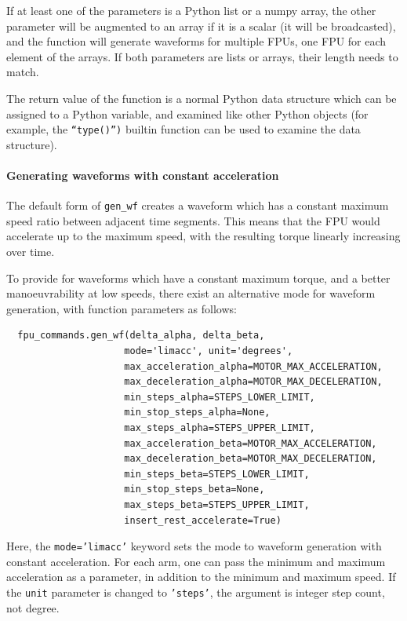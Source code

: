 \documentclass[11pt,a4paper]{report}
\begin{document}
%
If at least one of the parameters is a Python list or a numpy array,
the other parameter will be augmented to an array if it is a scalar
(it will be broadcasted), and the function will generate waveforms for
multiple FPUs, one FPU for each element of the arrays. If both
parameters are lists or arrays, their length needs to match.

The return value of the function is a normal Python data structure
which can be assigned to a Python variable, and examined like other
Python objects (for example, the \texttt{``type()'')} builtin function
can be used to examine the data structure).

\paragraph{Generating waveforms with constant acceleration}
\label{sec:genwf:constant-acceleration}
The default form of \texttt{gen\_wf} creates a waveform which has
a constant maximum speed ratio between adjacent time segments.
This means that the FPU would accelerate up to the maximum speed,
with the resulting torque linearly increasing over time.

To provide for waveforms which have a constant maximum torque, and a
better manoeuvrability at low speeds, there exist an alternative mode
for waveform generation, with function parameters as follows:

\begin{verbatim}
  fpu_commands.gen_wf(delta_alpha, delta_beta,
                     mode='limacc', unit='degrees',
                     max_acceleration_alpha=MOTOR_MAX_ACCELERATION,
                     max_deceleration_alpha=MOTOR_MAX_DECELERATION,
                     min_steps_alpha=STEPS_LOWER_LIMIT,
                     min_stop_steps_alpha=None,
                     max_steps_alpha=STEPS_UPPER_LIMIT,
                     max_acceleration_beta=MOTOR_MAX_ACCELERATION,
                     max_deceleration_beta=MOTOR_MAX_DECELERATION,
                     min_steps_beta=STEPS_LOWER_LIMIT,
                     min_stop_steps_beta=None,
                     max_steps_beta=STEPS_UPPER_LIMIT,
                     insert_rest_accelerate=True)
\end{verbatim}

Here, the \texttt{mode='limacc'} keyword sets the mode to waveform
generation with constant acceleration. For each arm, one can pass the
minimum and maximum acceleration as a parameter, in addition to the
minimum and maximum speed. If the \texttt{unit} parameter is changed
to \texttt{'steps'}, the argument is integer step count, not degree.
\end{document}
